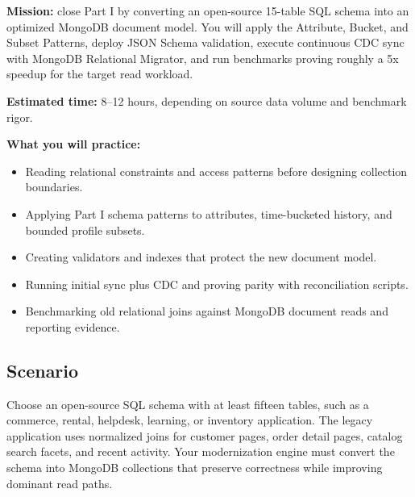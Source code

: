 \begin{capstonebox}
\textbf{Mission:} close Part I by converting an open-source 15-table SQL schema into an optimized MongoDB document model. You will apply the Attribute, Bucket, and Subset Patterns, deploy JSON Schema validation, execute continuous CDC sync with MongoDB Relational Migrator, and run benchmarks proving roughly a 5x speedup for the target read workload.

\textbf{Estimated time:} 8--12 hours, depending on source data volume and benchmark rigor.

\textbf{What you will practice:}
\begin{itemize}
    \item Reading relational constraints and access patterns before designing collection boundaries.
    \item Applying Part I schema patterns to attributes, time-bucketed history, and bounded profile subsets.
    \item Creating validators and indexes that protect the new document model.
    \item Running initial sync plus CDC and proving parity with reconciliation scripts.
    \item Benchmarking old relational joins against MongoDB document reads and reporting evidence.
\end{itemize}
\end{capstonebox}

\subsection*{Scenario}
Choose an open-source SQL schema with at least fifteen tables, such as a commerce, rental, helpdesk, learning, or inventory application. The legacy application uses normalized joins for customer pages, order detail pages, catalog search facets, and recent activity. Your modernization engine must convert the schema into MongoDB collections that preserve correctness while improving dominant read paths.

